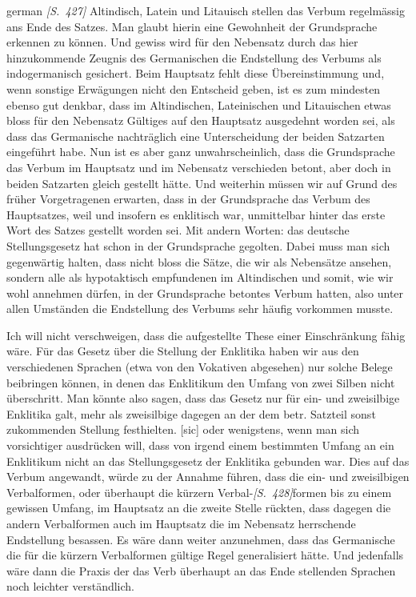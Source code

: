 \begin{otherlanguage*}{german}
\hypertarget{p427}{\emph{[S.~427]}}\label{p427} Altindisch, Latein und Litauisch stellen das Verbum regelmässig ans Ende des Satzes. Man glaubt hierin eine Gewohnheit der Grundsprache erkennen zu können. Und gewiss wird für den Nebensatz durch das hier hinzukommende Zeugnis des Germanischen die Endstellung des Verbums als indogermanisch gesichert. Beim Hauptsatz fehlt diese Übereinstimmung und, wenn sonstige Erwägungen nicht den Entscheid geben, ist es zum mindesten ebenso gut denkbar, dass im Altindischen, Lateinischen und Litauischen etwas bloss für den Nebensatz Gültiges auf den Hauptsatz ausgedehnt worden sei, als dass das Germanische nachträglich eine Unterscheidung der beiden Satzarten eingeführt habe. Nun ist es aber ganz unwahrscheinlich, dass die Grundsprache das Verbum im Hauptsatz und im Nebensatz verschieden betont, aber doch in beiden Satzarten gleich gestellt hätte. Und weiterhin müssen wir auf Grund des früher Vorgetragenen erwarten, dass in der Grundsprache das Verbum des Hauptsatzes, weil und insofern es enklitisch war, unmittelbar hinter das erste Wort des Satzes gestellt worden sei. Mit andern Worten: das deutsche Stellungsgesetz hat schon in der Grundsprache gegolten. Dabei muss man sich gegenwärtig halten, dass nicht bloss die Sätze, die wir als Nebensätze ansehen, sondern alle als hypotaktisch empfundenen im Altindischen und somit, wie wir wohl annehmen dürfen, in der Grundsprache betontes Verbum hatten, also unter allen Umständen die Endstellung des Verbums sehr häufig vorkommen musste.

Ich will nicht verschweigen, dass die aufgestellte These einer Einschränkung fähig wäre. Für das Gesetz über die Stellung der Enklitika haben wir aus den verschiedenen Sprachen (etwa von den Vokativen abgesehen) nur solche Belege beibringen können, in denen das Enklitikum den Umfang von zwei Silben nicht überschritt.  Man könnte also sagen, dass das Gesetz nur für ein- und zweisilbige Enklitika galt, mehr als zweisilbige dagegen an der dem betr. Satzteil sonst zukommenden Stellung festhielten. [sic] oder wenigstens, wenn man sich vorsichtiger ausdrücken will, dass von irgend einem bestimmten Umfang an ein Enklitikum nicht an das Stellungsgesetz der Enklitika gebunden war. Dies auf das Verbum angewandt, würde zu der Annahme führen, dass die ein- und zweisilbigen Verbalformen, oder überhaupt die kürzern Verbal-\hypertarget{p428}{\emph{[S.~428]}}\label{p428}formen bis zu einem gewissen Umfang, im Hauptsatz an die zweite Stelle rückten, dass dagegen die andern Verbalformen auch im Hauptsatz die im Nebensatz herrschende Endstellung besassen. Es wäre dann weiter anzunehmen, dass das Germanische die für die kürzern Verbalformen gültige Regel generalisiert hätte. Und jedenfalls wäre dann die Praxis der das Verb überhaupt an das Ende stellenden Sprachen noch leichter verständlich.


\end{otherlanguage*}
